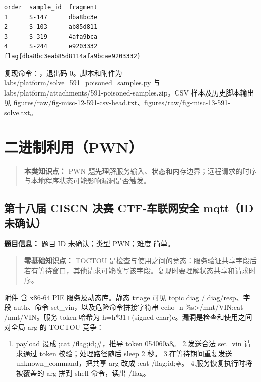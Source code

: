 \begin{verbatim}
order  sample_id  fragment
1      S-147      dba8bc3e
2      S-103      ab85d811
3      S-319      4afa9bca
4      S-244      e9203332
flag{dba8bc3eab85d8114afa9bcae9203332}
\end{verbatim}

复现命令：\texttt{}，退出码 0。脚本和附件为 labs/platform/solve\_591\_poisoned\_samples.py 与 labs/platform/attachments/591-poisoned-samples.zip。CSV 样本及历史脚本输出见 figures/raw/fig-misc-12-591-csv-head.txt、figures/raw/fig-misc-13-591-solve.txt。

\chapter{二进制利用（PWN）}\label{ux4e8cux8fdbux5236ux5229ux7528pwn}

\begin{quote}
\textbf{本类知识点：} PWN 题先理解服务输入、状态和内存边界；远程请求的时序与本地程序状态可能影响漏洞是否触发。
\end{quote}

\section{第十八届 CISCN 决赛 CTF-车联网安全 mqtt（ID 未确认）}\label{ux7b2cux5341ux516bux5c4a-ciscn-ux51b3ux8d5b-ctf-ux8f66ux8054ux7f51ux5b89ux5168-mqttid-ux672aux786eux8ba4}

\textbf{题目信息：} 题目 ID 未确认；类型 PWN；难度 简单。

\begin{quote}
\textbf{零基础知识点：} TOCTOU 是检查与使用之间的竞态：服务验证共享字段后若有等待窗口，其他请求可能改写该字段。复现时要理解状态共享和请求时序。
\end{quote}

附件 \texttt{} 含 x86-64 PIE 服务及动态库。静态 triage 可见 topic diag / diag/resp、字段 auth、命令 set\_vin，以及危险命令拼接字符串 echo -n \%s\textgreater/mnt/VIN;cat /mnt/VIN。服务 token 哈希为 h=h*31+(signed char)c。漏洞是检查和使用之间对全局 arg 的 TOCTOU 竞争：

\begin{enumerate}
\def\labelenumi{\arabic{enumi}.}
\tightlist
\item
  payload 设成 ;cat /flag;id;\#，推导 token 054060a8。 2.发送合法 set\_vin 请求通过 token 校验；处理路径随后 sleep 2 秒。 3.在等待期间重复发送 unknown\_command，把共享 arg 改成 ;cat /flag;id;\#。 4.服务恢复执行时将被覆盖的 arg 拼到 shell 命令，读出 /flag。
\end{enumerate}

